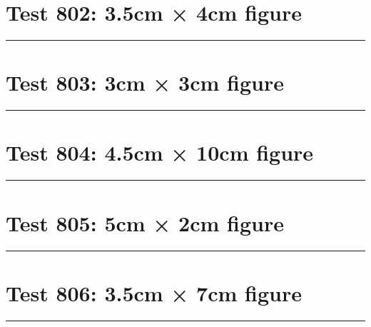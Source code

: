 \documentclass[a4paper,11pt]{article}
\begin{document}
\section*{Test 802: 3.5cm × 4cm figure}
\begin{swarmwrap}%
  \begin{minipage}[t]{3cm}
    \centering
    \rule{\linewidth}{4cm}
  \end{minipage}%
\end{swarmwrap}%
\swarmwrapnext
\lipsum[42]
\lipsum[43]
\lipsum[44]
\lipsum[45]
\lipsum[46]
\section*{Test 803: 3cm × 3cm figure}
\begin{swarmwrap}%
  \begin{minipage}[t]{3cm}
    \centering
    \rule{\linewidth}{3cm}
  \end{minipage}%
\end{swarmwrap}%
\swarmwrapnext
\lipsum[60]
\lipsum[61]
\lipsum[62]
\section*{Test 804: 4.5cm × 10cm figure}
\begin{swarmwrap}%
  \begin{minipage}[t]{4cm}
    \centering
    \rule{\linewidth}{10cm}
  \end{minipage}%
\end{swarmwrap}%
\swarmwrapnext
\lipsum[13]
\lipsum[14]
\lipsum[15]
\section*{Test 805: 5cm × 2cm figure}
\begin{swarmwrap}%
  \begin{minipage}[t]{5cm}
    \centering
    \rule{\linewidth}{2cm}
  \end{minipage}%
\end{swarmwrap}%
\swarmwrapnext
\lipsum[13]
\lipsum[14]
\lipsum[15]
\lipsum[16]
\section*{Test 806: 3.5cm × 7cm figure}
\begin{swarmwrap}%
  \begin{minipage}[t]{3cm}
    \centering
    \rule{\linewidth}{7cm}
  \end{minipage}%
\end{swarmwrap}%
\swarmwrapnext
\lipsum[40]
\lipsum[41]
\lipsum[42]
\lipsum[43]
\lipsum[44]
\lipsum[45]
\end{document}
